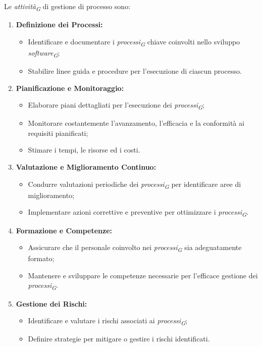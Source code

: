 Le \textit{attività}\textsubscript{\textit{G}} di gestione di processo sono:
\begin{enumerate}
	\item \textbf{Definizione dei Processi:}
	\begin{itemize}
		\item Identificare e documentare i \textit{processi}\textsubscript{\textit{G}} chiave coinvolti nello sviluppo \textit{software}\textsubscript{\textit{G}};
		\item Stabilire linee guida e procedure per l'esecuzione di ciascun processo.
	\end{itemize}

	\item \textbf{Pianificazione e Monitoraggio:}
	\begin{itemize}
		\item Elaborare piani dettagliati per l'esecuzione dei \textit{processi}\textsubscript{\textit{G}};
		\item Monitorare costantemente l'avanzamento, l'efficacia e la conformità ai requisiti pianificati;
		\item Stimare i tempi, le risorse ed i costi.
	\end{itemize}
	\pagebreak

	\item \textbf{Valutazione e Miglioramento Continuo:}
	\begin{itemize}
		\item Condurre valutazioni periodiche dei \textit{processi}\textsubscript{\textit{G}} per identificare aree di miglioramento;
		\item Implementare azioni correttive e preventive per ottimizzare i \textit{processi}\textsubscript{\textit{G}}.
	\end{itemize}

	\item \textbf{Formazione e Competenze:}
	\begin{itemize}
		\item Assicurare che il personale coinvolto nei \textit{processi}\textsubscript{\textit{G}} sia adeguatamente formato;
		\item Mantenere e sviluppare le competenze necessarie per l'efficace gestione dei \textit{processi}\textsubscript{\textit{G}}.
	\end{itemize}

	\item \textbf{Gestione dei Rischi:}
	\begin{itemize}
		\item Identificare e valutare i rischi associati ai \textit{processi}\textsubscript{\textit{G}};
		\item Definire strategie per mitigare o gestire i rischi identificati.
	\end{itemize}
\end{enumerate}
	
